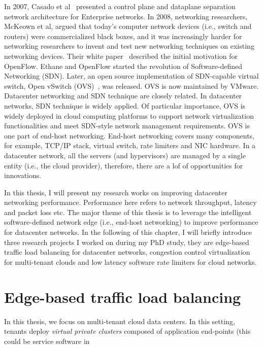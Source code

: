 In 2007, Casado et al~\cite{casado2007ethane} presented a control plane and dataplane separation network architecture for 
Enterprise networks. In 2008, networking researchers, McKeown et al, argued that today's computer network 
devices (i.e., switch and routers) were commercialized black boxes, 
and it was increasingly harder for networking researchers to invent and test new networking 
techniques on existing networking devices. Their white paper~\cite{McKeown08} described the initial motivation 
for OpenFlow. Ethane and OpenFlow started the revolution of Software-defined Networking (SDN). 
Later, an open source implementation of SDN-capable virtual switch, Open vSwitch (OVS)~\cite{Pfaff2015ovs}, was released. 
OVS is now maintained by VMware. Datacenter networking and SDN technique are closely related. 
In datacenter networks, SDN technique is widely applied. Of particular importance, 
OVS is widely deployed in cloud computing platforms to support network virtualization functionalities and 
meet SDN-style network management requirements. OVS is one part of end-host networking.
End-host networking covers many components, for example, TCP/IP stack, virtual switch, rate limiters and NIC hardware. 
In a datacenter network, all the servers (and hypervisors) are managed by a single entity 
(i.e., the cloud provider), therefore, there are a lof of opportunities for innovations.

In this thesis, I will present my research works on improving datacenter networking performance. 
Performance here refers to network throughput, latency and packet loss etc. 
The major theme of this thesis is to leverage the intelligent software-defined network 
edge (i.e., end-host networking) to improve performance for datacenter networks.
In the following of this chapter, I will briefly introduce three research projects I worked on 
during my PhD study, they are \textemdash\xspace edge-based traffic load balancing for 
datacenter networks, congestion control virtualization for multi-tenant clouds and 
low latency software rate limiters for cloud networks.

\section{Edge-based traffic load balancing}

In this thesis, we focus on multi-tenant cloud data centers.
In this setting, tenants deploy \emph{virtual private clusters}
composed of application end-points (this could be service software in

